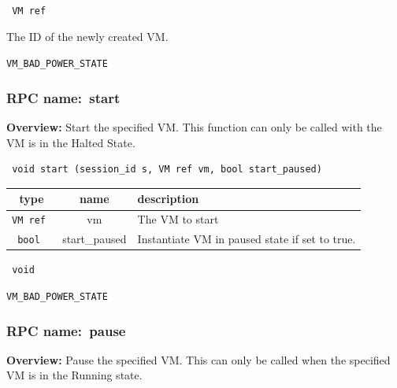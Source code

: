 \vspace{0.3cm}

{\tt 
VM ref
}


The ID of the newly created VM.
\vspace{0.3cm}

 {\tt VM\_BAD\_POWER\_STATE}

\vspace{0.6cm}
\subsubsection{RPC name:~start}

{\bf Overview:} 
Start the specified VM.  This function can only be called with the VM is in the Halted State.

\begin{verbatim} void start (session_id s, VM ref vm, bool start_paused)\end{verbatim}



 
\vspace{0.3cm}
\begin{tabular}{|c|c|p{7cm}|}
 \hline
{\bf type} & {\bf name} & {\bf description} \\ \hline
{\tt VM ref } & vm & The VM to start \\ \hline 

{\tt bool } & start\_paused & Instantiate VM in paused state if set to true. \\ \hline 

\end{tabular}

\vspace{0.3cm}

{\tt 
void
}



\vspace{0.3cm}

 {\tt VM\_BAD\_POWER\_STATE}

\vspace{0.6cm}
\subsubsection{RPC name:~pause}

{\bf Overview:} 
Pause the specified VM. This can only be called when the specified VM is in the Running state.

